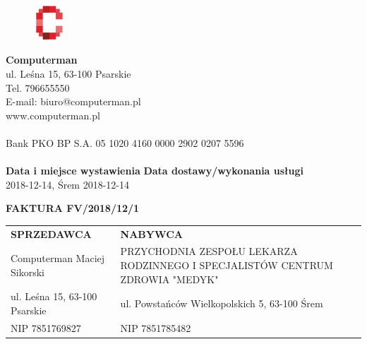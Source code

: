 \documentclass[a4paper,10pt]{article}
\date{}
\begin{document}
    \noindent
    \begin{figure}
	  \begin{center}
		\includegraphics[width=0.1\textwidth]{logo_fv.png}
	  \end{center}
    \end{figure}


    \noindent
    \textbf{Computerman}\\
    ul. Leśna 15, 63-100 Psarskie\\
    Tel. 796655550\\
    E-mail: biuro@computerman.pl\\
    www.computerman.pl\\
    \\
    Bank PKO BP S.A.
    05 1020 4160 0000 2902 0207 5596\\
    \\
  
\noindent
    \textbf{Data i miejsce wystawienia}		\hfill \textbf{Data dostawy/wykonania usługi}\\
    2018-12-14, Śrem							        \hfill	2018-12-14\\
  
    \begin{center}
    \textbf{\huge{FAKTURA FV/2018/12/1}}
    \end{center}
    \vspace{2cm}
  
    \noindent
    
    \begin{table}[H]
        \raggedleft
        \begin{tabular}{ b{8cm}  b{8cm}}
            \textbf{SPRZEDAWCA} & \hfill \textbf{NABYWCA}\\
            Computerman Maciej Sikorski & PRZYCHODNIA ZESPOŁU LEKARZA RODZINNEGO I SPECJALISTÓW CENTRUM ZDROWIA "MEDYK" \\
            ul. Leśna 15, 63-100 Psarskie & ul. Powstańców Wielkopolskich 5, 63-100 Śrem \\
            NIP 7851769827 & NIP 7851785482\\

        \end{tabular}
        \end{table}
  
\end{document}
